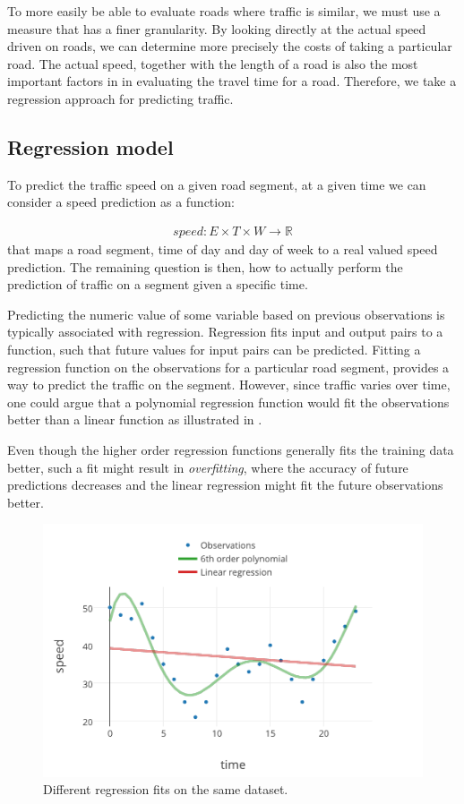 To more easily be able to evaluate roads where traffic is similar, we must use a measure that has a finer granularity. By looking directly at the actual speed driven on roads, we can determine more precisely the costs of taking a particular road. The actual speed, together with the length of a road is also the most important factors in in evaluating the travel time for a road. Therefore, we take a regression approach for predicting traffic.
\subsection{Regression model}\label{patterns:regression-model}
To predict the traffic speed on a given road segment, at a given time we can consider a speed prediction as a function:

\begin{align}\label{eq:speed}
speed: E \times T \times W \rightarrow \mathbb{R}
\end{align}
that maps a road segment, time of day and day of week to a real valued speed prediction. The remaining question is then, how to actually perform the prediction of traffic on a segment given a specific time. \par
Predicting the numeric value of some variable based on previous observations is typically associated with regression. Regression fits input and output pairs to a function, such that future values for input pairs can be predicted. Fitting a regression function on the observations for a particular road segment, provides a way to predict the traffic on the segment. However, since traffic varies over time, one could argue that a polynomial regression function would fit the observations better than a linear function as illustrated in .

Even though the higher order regression functions generally fits the training data better, such a fit might result in \emph{overfitting}, where the accuracy of future predictions decreases and the linear regression might fit the future observations better.

\begin{figure}[h]
	\includegraphics[width=\textwidth]{figures/compare-regression.pdf}
	\caption{Different regression fits on the same dataset.}
	\label{fig:compare-regression}
\end{figure}

